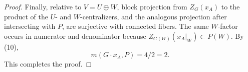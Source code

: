 \documentclass[10pt]{article}
\begin{document}
\begin{proof}
Finally, relative to \(V=U\oplus W\), block projection from \(Z_G(x_A)\) to the
product of the \(U\)- and \(W\)-centralizers, and the analogous projection after
intersecting with \(P\), are surjective with connected fibers.  The same
\(W\)-factor occurs in numerator and denominator because
\(Z_{G(W)}(x_A|_W)\subset P(W)\).  By (10),
\[
m(G\cdot x_A,P)=4/2=2.
\]
This completes the proof.
\end{proof}
\end{document}
